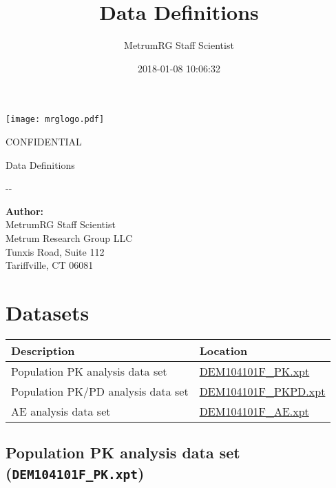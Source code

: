 \documentclass[]{article}
\title{Data Definitions}
\author{MetrumRG Staff Scientist}
\date{2018-01-08 10:06:32}
\newcommand{\todaymetrum}{\the\year-\twodigit{\month}-\twodigit{\day}}
\newcommand{\doctitle}{Data Definitions}
\newcommand{\scientist}{MetrumRG Staff Scientist}
\begin{document}
\begin{center}
\texttt{[image: mrglogo.pdf]}
\vspace{1cm}

{\Large CONFIDENTIAL}
\vspace{3.0cm}

{\huge \doctitle}
\vspace{1cm}

\todaymetrum
\vspace{6cm}

{\large\bfseries Author:}\\
\scientist \\
 Metrum Research Group LLC\\
Tunxis Road, Suite 112\\
Tariffville, CT 06081\\
\end{center}


\newpage



\section{Datasets}\label{datasets}

\begin{tabular}{|p{2.85in}|p{2.55in}|}
\hline
Description & Location\\
\hline
Population PK analysis data set & \hyperref[DEM104101F_PK]{DEM104101F\_PK.xpt}\\
\hline
Population PK/PD analysis data set & \hyperref[DEM104101F_PKPD]{DEM104101F\_PKPD.xpt}\\
\hline
AE analysis data set & \hyperref[DEM104101F_AE]{DEM104101F\_AE.xpt}\\
\hline
\end{tabular}

\subsection{\texorpdfstring{Population PK analysis data set
(\texttt{DEM104101F\_PK.xpt})
\label{DEM104101F_PK}}{Population PK analysis data set (DEM104101F\_PK.xpt) }}\label{population-pk-analysis-data-set-dem104101f_pk.xpt}

\noindent
\end{document}
